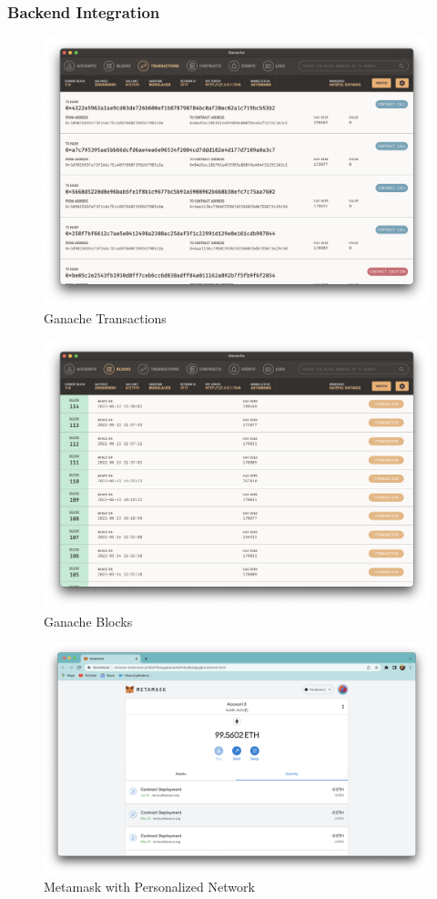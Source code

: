 \documentclass[12pt,a4paper,twocolumn,fleqn]{article}
\begin{document}
\subsubsection{Backend Integration}
\begin{figure} [H]
\includegraphics[width=13cm]{media/Ganache_Transactions.png}
\centering
\caption{Ganache Transactions}
\end{figure}
\begin{figure} [H]
\includegraphics[width=13cm]{media/Ganache_Blocks.png}
\centering
\caption{Ganache Blocks}
\end{figure}
\begin{figure} [H]
\includegraphics[width=15cm]{media/Metamask_Foodereum.png}
\centering
\caption{Metamask with Personalized Network}
\end{figure}
\end{document}
